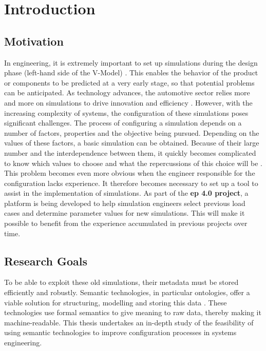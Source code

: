 \section{Introduction\label{sec:introduction}}


\subsection{Motivation}
In engineering, it is extremely important to set up simulations during the design phase (left-hand side of the V-Model) \cite{hammami2015thefose}. This enables the behavior of the product or components to be predicted at a very early stage, so that potential problems can be anticipated.  As technology advances, the automotive sector relies more and more on simulations to drive innovation and efficiency \cite{hammami2015thefose}. However, with the increasing complexity of systems, the configuration of these simulations poses significant challenges. The process of configuring a simulation depends on a number of factors, properties and the objective being pursued. Depending on the values of these factors, a basic simulation can be obtained. Because of their large number and the interdependence between them, it quickly becomes complicated to know which values to choose and what the repercussions of this choice will be \cite{hammami2015thefose, horsch2021osmo, spelten2023simulation}. This problem becomes even more obvious when the engineer responsible for the configuration lacks experience. It therefore becomes necessary to set up a tool to assist in the implementation of simulations. As part of the \textbf{\acrfull{ep} 4.0 project}, a platform is being developed to help simulation engineers select previous load cases and determine parameter values for new simulations. This will make it possible to benefit from the experience accumulated in previous projects over time.


\subsection{Research Goals}
To be able to exploit these old simulations, their metadata must be stored efficiently and robustly. Semantic technologies, in particular ontologies, offer a viable solution for structuring, modelling and storing this data \cite{horsch2021osmo, spelten2023simulation}. These technologies use formal semantics to give meaning to raw data, thereby making it machine-readable. This thesis undertakes an in-depth study of the feasibility of using semantic technologies to improve configuration processes in systems engineering.\\

